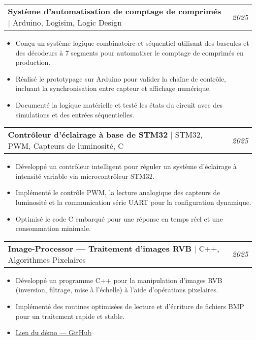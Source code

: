 \documentclass[a4paper,12pt]{article}
\begin{document}
\begin{tabularx}{\linewidth}{@{}X r@{}}
\textbf{Système d’automatisation de comptage de comprimés} | Arduino, Logisim, Logic Design & \textit{2025} \\
\end{tabularx}
\begin{itemize}[leftmargin=1em]
    \item Conçu un système logique combinatoire et séquentiel utilisant des bascules et des décodeurs à 7 segments pour automatiser le comptage de comprimés en production.
    \item Réalisé le prototypage sur Arduino pour valider la chaîne de contrôle, incluant la synchronisation entre capteur et affichage numérique.
    \item Documenté la logique matérielle et testé les états du circuit avec des simulations et des entrées séquentielles.
\end{itemize}

\vspace{0.8em}

\begin{tabularx}{\linewidth}{@{}X r@{}}
\textbf{Contrôleur d’éclairage à base de STM32} | STM32, PWM, Capteurs de luminosité, C & \textit{2025} \\
\end{tabularx}
\begin{itemize}[leftmargin=1em]
    \item Développé un contrôleur intelligent pour réguler un système d’éclairage à intensité variable via microcontrôleur STM32.
    \item Implémenté le contrôle PWM, la lecture analogique des capteurs de luminosité et la communication série UART pour la configuration dynamique.
    \item Optimisé le code C embarqué pour une réponse en temps réel et une consommation minimale.
\end{itemize}

\vspace{0.8em}

\begin{tabularx}{\linewidth}{@{}X r@{}}
\textbf{Image-Processor — Traitement d’images RVB} | C++, Algorithmes Pixelaires & \textit{2025} \\
\end{tabularx}
\begin{itemize}[leftmargin=1em]
    \item Développé un programme C++ pour la manipulation d’images RVB (inversion, filtrage, mise à l’échelle) à l’aide d’opérations pixelaires.
    \item Implémenté des routines optimisées de lecture et d’écriture de fichiers BMP pour un traitement rapide et stable.
    \item \href{https://github.com/AbderrahmaneErraqabi/Image-processor}{Lien du démo — GitHub}
\end{itemize}
\end{document}
